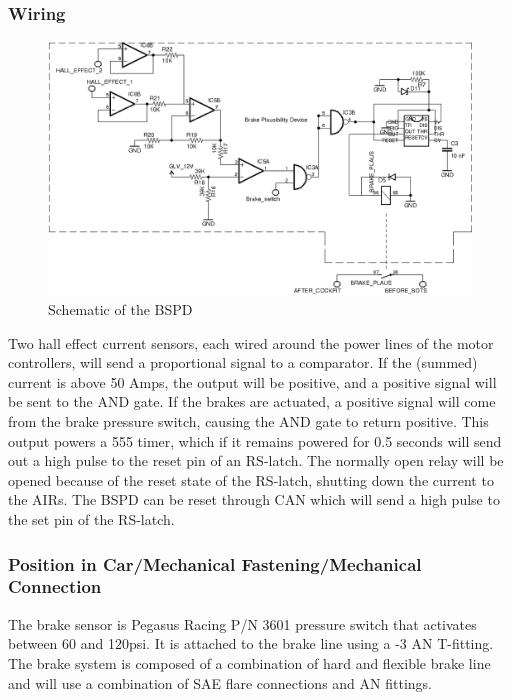 \documentclass{article}
\begin{document}
        \subsubsection{Wiring}

            \begin{figure}[H]
                \centering
                \includegraphics[width = 0.9 \textwidth]{BSPD}
                \caption{Schematic of the BSPD}
                \label{BSPDschem}
            \end{figure}

Two hall effect current sensors, each wired around the power lines of the motor controllers, will send a proportional signal to a comparator. If the (summed) current is above 50 Amps, the output will be positive, and a positive signal will be sent to the AND gate. If the brakes are actuated, a positive signal will come from the brake pressure switch, causing the AND gate to return positive. This output powers a 555 timer, which if it remains powered for 0.5 seconds will send out a high pulse to the reset pin of an RS-latch. The normally open relay will be opened because of the reset state of the RS-latch, shutting down the current to the AIRs. The BSPD can be reset through CAN which will send a high pulse to the set pin of the RS-latch.




        \subsubsection{Position in Car/Mechanical Fastening/Mechanical Connection}
 The brake sensor is Pegasus Racing P/N 3601 pressure switch that activates between 60 and 120psi. It is attached to the brake line using a -3 AN T-fitting. The brake system is composed of a combination of hard and flexible brake line and will use a combination of SAE flare connections and AN fittings.
\end{document}
